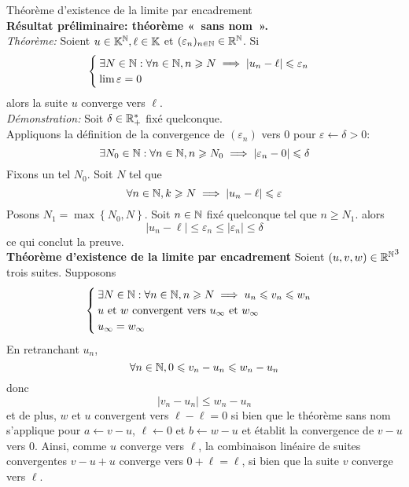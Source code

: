 \documentclass{article}
\begin{document}
\begin{question_kholle}{Théorème d’existence de la limite par encadrement}
	\hfill\\
	\textbf{Résultat préliminaire: théorème «~sans nom~».}\\
	\textit{Théorème: } Soient $u\in\mathbb K^{\mathbb N}, \ell\in\mathbb K$ et $(\varepsilon_{n})_{n\in\mathbb N}\in\mathbb R^{\mathbb N}$. Si
	\[
		\begin{cases}
			\exists N\in\mathbb N: \forall n\in\mathbb N, n\geqslant N \implies |u_{n}-\ell|\leqslant \varepsilon_{n} \\
			\lim \varepsilon=0
		\end{cases}
	\]
	alors la suite $u$ converge vers $\ell$.\\[4pt]
	\textit{Démonstration: }
	Soit $\delta\in\mathbb R_{+}^{*}$ fixé quelconque.\\
	Appliquons la définition de la convergence de $(\varepsilon_{n})$ vers 0 pour $\varepsilon\leftarrow \delta>0$:
	\[
		\exists N_{0}\in\mathbb N: \forall n\in\mathbb N, n\geqslant N_{0}\implies |\varepsilon_{n}-0|\leqslant \delta
	\]
	Fixons un tel $N_{0}$. Soit $N$ tel que
	\[
		\forall n\in\mathbb N, k\geqslant N \implies  |u_{n}-\ell|\leqslant \varepsilon
	\]
	Posons $N_{1}=\max \left\{N_{0}, N\right\}$. Soit $n\in\mathbb N$ fixé quelconque tel que $n\geq N_{1}$. alors
	\[
		|u_{n}-\ell|\leq \varepsilon_{n} \leq |\varepsilon_{n}| \leq \delta
	\]
	ce qui conclut la preuve.\\[5pt]

	\noindent\textbf{Théorème d’existence de la limite par encadrement}
	Soient $(u,v,w)\in{\ensuremath{\mathbb R} ^{\ensuremath{\mathbb N} }}^{3}$ trois suites. Supposons
	\[
		\begin{cases}
			\exists N\in\mathbb N:\forall n\in\mathbb N, n\geqslant N \implies u_{n}\leqslant v_{n}\leqslant w_{n} \\
			\text{$u$ et $w$ convergent vers $u_{\infty}$ et $w_{\infty}$}            \\
			u_{\infty} = w_{\infty}
		\end{cases}
	\]
	En retranchant $u_{n}$,
	\[
		\forall n\in\mathbb N, 0\leqslant v_{n}-u_{n}\leqslant w_{n}-u_{n}
	\]
	donc
	\[
		|v_{n}-u_{n}|\leq w_{n}-u_{n}
	\]
	et de plus, $w$ et $u$ convergent vers $\ell-\ell=0$ si bien que le théorème sans nom s’applique pour $a\leftarrow v-u$, $\ell\leftarrow 0$ et $b\leftarrow w-u$ et établit la convergence de $v-u$ vers 0. Ainsi, comme $u$ converge vers $\ell$, la combinaison linéaire de suites convergentes $v-u+u$ converge vers $0+\ell=\ell$, si bien que la suite $v$ converge vers $\ell$.
\end{question_kholle}
\end{document}
